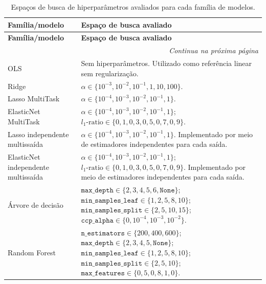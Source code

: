 \begin{longtable}{p{3.8cm} p{9.8cm}}
\caption[Espaços de busca de hiperparâmetros por família de modelos]{Espaços de busca de hiperparâmetros avaliados para cada família de modelos.}
\label{tab:espacos_busca_modelos}\\

\hline
\textbf{Família/modelo} & \textbf{Espaço de busca avaliado} \\
\hline
\endfirsthead

\hline
\textbf{Família/modelo} & \textbf{Espaço de busca avaliado} \\
\hline
\endhead

\hline
\multicolumn{2}{r}{\textit{Continua na próxima página}} \\
\endfoot

\hline
\endlastfoot

OLS
&
Sem hiperparâmetros. Utilizado como referência linear sem regularização. \\

Ridge
&
\(\alpha \in \{10^{-3},10^{-2},10^{-1},1,10,100\}\). \\

Lasso MultiTask
&
\(\alpha \in \{10^{-4},10^{-3},10^{-2},10^{-1},1\}\). \\

ElasticNet MultiTask
&
\(\alpha \in \{10^{-4},10^{-3},10^{-2},10^{-1},1\}\);
\(l_1\text{-ratio} \in \{0{,}1,0{,}3,0{,}5,0{,}7,0{,}9\}\). \\

Lasso independente multissaída
&
\(\alpha \in \{10^{-4},10^{-3},10^{-2},10^{-1},1\}\). Implementado por meio de estimadores independentes para cada saída. \\

ElasticNet independente multissaída
&
\(\alpha \in \{10^{-4},10^{-3},10^{-2},10^{-1},1\}\);
\(l_1\text{-ratio} \in \{0{,}1,0{,}3,0{,}5,0{,}7,0{,}9\}\). Implementado por meio de estimadores independentes para cada saída. \\

Árvore de decisão
&
\(\texttt{max\_depth} \in \{2,3,4,5,6,\texttt{None}\}\);
\(\texttt{min\_samples\_leaf} \in \{1,2,5,8,10\}\);
\(\texttt{min\_samples\_split} \in \{2,5,10,15\}\);
\(\texttt{ccp\_alpha} \in \{0,10^{-4},10^{-3},10^{-2}\}\). \\

Random Forest
&
\(\texttt{n\_estimators} \in \{200,400,600\}\);
\(\texttt{max\_depth} \in \{2,3,4,5,\texttt{None}\}\);
\(\texttt{min\_samples\_leaf} \in \{1,2,5,8,10\}\);
\(\texttt{min\_samples\_split} \in \{2,5,10\}\);
\(\texttt{max\_features} \in \{0{,}5,0{,}8,1{,}0\}\). \\


\end{longtable}
